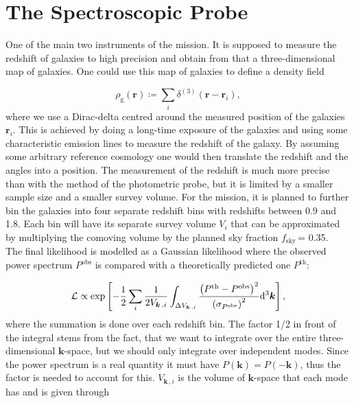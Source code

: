 \documentclass[../main.tex]{subfiles}
\begin{document}
\chapter{The Spectroscopic Probe}

One of the main two instruments of the \Euclid mission. It is supposed to measure the redshift of galaxies to high precision and obtain from that a three-dimensional
map of galaxies. One could use this map of galaxies to define a density field 

\begin{equation}
    \rho_\mathrm{g}(\boldsymbol{r}) \coloneq \sum_i \delta^{(3)}(\boldsymbol{r}-\boldsymbol{r}_i),
\end{equation}
where we use a Dirac-delta centred around the measured position of the galaxies $\boldsymbol{r}_i$. This is achieved by doing a long-time exposure of the galaxies and using some characteristic emission lines to measure the redshift of the galaxy. By assuming some arbitrary reference cosmology one would then translate the redshift and the angles into a position. The measurement of the redshift is much more precise than with the method of the photometric probe, but it is limited by a smaller sample size and a smaller survey volume. For the \Euclid mission, it is planned to further bin the galaxies into four separate redshift bins with redshifts between 0.9 and 1.8. Each bin will have its separate survey volume $V_i$ that can be approximated by multiplying the comoving volume by the planned sky fraction $f_\mathrm{sky}\,$= 0.35.\\
The final likelihood is modelled as a Gaussian likelihood where the observed power spectrum $P^\mathrm{obs}$ is compared with a theoretically predicted one $P^\mathrm{th}$: 

\begin{equation}
   \mathcal{L} \propto \exp\left[-\frac{1}{2} \sum_i \frac{1}{2 V_{\boldsymbol{k}\,,i}} \int_{\Delta V_{\boldsymbol{k}\,,i}} \frac{\left(P^\mathrm{th}-P^\mathrm{obs}\right)^2}{\left(\sigma_{P^\mathrm{obs}}\right)^2} \mathrm{d}^3 \boldsymbol{k} \right],
\end{equation} 
where the summation is done over each redshift bin. The factor 1/2 in front of the integral stems from the fact, that we want to integrate over the entire three-dimensional $\boldsymbol{k}$-space, but we should only integrate over independent modes. Since the power spectrum is a real quantity it must have $P(\boldsymbol{k})=P(-\boldsymbol{k})$, thus the factor is needed to account for this. $V_{\boldsymbol{k}\,,i}$ is the volume of $\boldsymbol{k}$-space that each mode has and is given through
\end{document}
